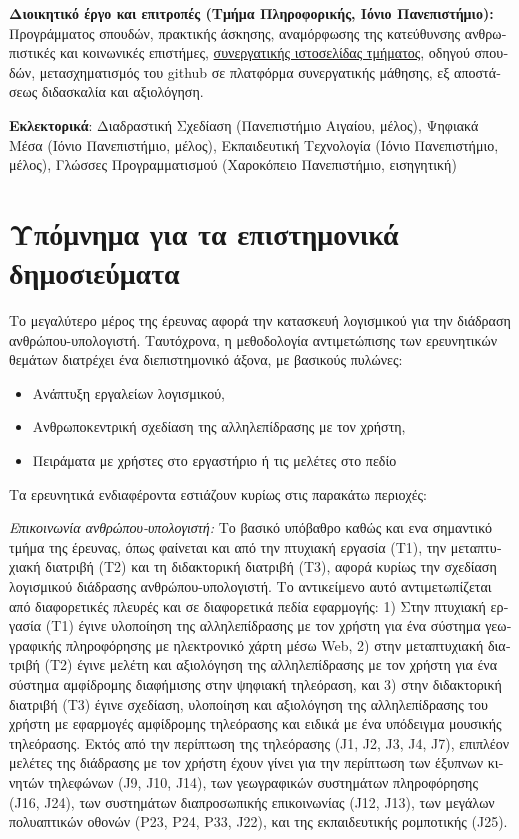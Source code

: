 \documentclass[11pt, a4paper]{article}
\begin{document}
\begin{greek}
\textbf{Διοικητικό έργο και επιτροπές (Τμήμα Πληροφορικής, Ιόνιο
Πανεπιστήμιο):} Προγράμματος σπουδών, πρακτικής άσκησης, αναμόρφωσης της
κατεύθυνσης ανθρωπιστικές και κοινωνικές επιστήμες,
\href{https://github.com/ioniodi/sitegr}{συνεργατικής ιστοσελίδας
τμήματος}, οδηγού σπουδών, μετασχηματισμός του github σε πλατφόρμα
συνεργατικής μάθησης, εξ αποστάσεως διδασκαλία και αξιολόγηση.

\textbf{Εκλεκτορικά}: Διαδραστική Σχεδίαση (Πανεπιστήμιο Αιγαίου,
μέλος), Ψηφιακά Μέσα (Ιόνιο Πανεπιστήμιο, μέλος), Εκπαιδευτική
Τεχνολογία (Ιόνιο Πανεπιστήμιο, μέλος), Γλώσσες Προγραμματισμού
(Χαροκόπειο Πανεπιστήμιο, εισηγητική)

\section{Υπόμνημα για τα επιστημονικά
δημοσιεύματα}\label{ux3c5ux3c0ux3ccux3bcux3bdux3b7ux3bcux3b1-ux3b3ux3b9ux3b1-ux3c4ux3b1-ux3b5ux3c0ux3b9ux3c3ux3c4ux3b7ux3bcux3bfux3bdux3b9ux3baux3ac-ux3b4ux3b7ux3bcux3bfux3c3ux3b9ux3b5ux3cdux3bcux3b1ux3c4ux3b1}

Το μεγαλύτερο μέρος της έρευνας αφορά την κατασκευή λογισμικού για την
διάδραση ανθρώπου-υπολογιστή. Ταυτόχρονα, η μεθοδολογία αντιμετώπισης
των ερευνητικών θεμάτων διατρέχει ένα διεπιστημονικό άξονα, με βασικούς
πυλώνες:

\begin{itemize}
\item
  Ανάπτυξη εργαλείων λογισμικού,
\item
  Ανθρωποκεντρική σχεδίαση της αλληλεπίδρασης με τον χρήστη,
\item
  Πειράματα με χρήστες στο εργαστήριο ή τις μελέτες στο πεδίο
\end{itemize}

Τα ερευνητικά ενδιαφέροντα εστιάζουν κυρίως στις παρακάτω περιοχές:

\emph{Επικοινωνία ανθρώπου-υπολογιστή:} Το βασικό υπόβαθρο καθώς και ενα
σημαντικό τμήμα της έρευνας, όπως φαίνεται και από την πτυχιακή εργασία
(Τ1), την μεταπτυχιακή διατριβή (Τ2) και τη διδακτορική διατριβή (Τ3),
αφορά κυρίως την σχεδίαση λογισμικού διάδρασης ανθρώπου-υπολογιστή. Το
αντικείμενο αυτό αντιμετωπίζεται από διαφορετικές πλευρές και σε
διαφορετικά πεδία εφαρμογής: 1) Στην πτυχιακή εργασία (Τ1) έγινε
υλοποίηση της αλληλεπίδρασης με τον χρήστη για ένα σύστημα γεωγραφικής
πληροφόρησης με ηλεκτρονικό χάρτη μέσω Web, 2) στην μεταπτυχιακή
διατριβή (Τ2) έγινε μελέτη και αξιολόγηση της αλληλεπίδρασης με τον
χρήστη για ένα σύστημα αμφίδρομης διαφήμισης στην ψηφιακή τηλεόραση, και
3) στην διδακτορική διατριβή (Τ3) έγινε σχεδίαση, υλοποίηση και
αξιολόγηση της αλληλεπίδρασης του χρήστη με εφαρμογές αμφίδρομης
τηλεόρασης και ειδικά με ένα υπόδειγμα μουσικής τηλεόρασης. Εκτός από
την περίπτωση της τηλεόρασης (J1, J2, J3, J4, J7), επιπλέον μελέτες της
διάδρασης με τον χρήστη έχουν γίνει για την περίπτωση των έξυπνων
κινητών τηλεφώνων (J9, J10, J14), των γεωγραφικών συστημάτων
πληροφόρησης (J16, J24), των συστημάτων διαπροσωπικής επικοινωνίας (J12,
J13), των μεγάλων πολυαπτικών οθονών (P23, P24, P33, J22), και της
εκπαιδευτικής ρομποτικής (J25).


\end{greek}
\end{document}
